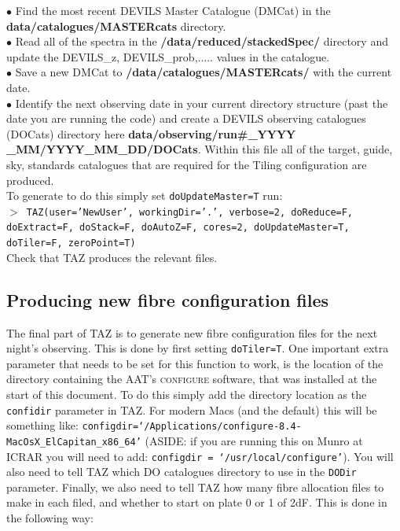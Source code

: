\documentclass[12pt]{article}
\begin{document}
$\bullet$ Find the most recent DEVILS Master Catalogue (DMCat) in the \textbf{data/catalogues/MASTERcats} directory.\\


$\bullet$ Read all of the spectra in the \textbf{/data/reduced/stackedSpec/} directory and update the DEVILS\_z,  DEVILS\_prob,..... values in the catalogue.\\

$\bullet$ Save a new DMCat to \textbf{/data/catalogues/MASTERcats/} with the current date. \\

$\bullet$ Identify the next observing date in your current directory structure (past the date you are running the code) and create a DEVILS observing catalogues (DOCats) directory here \textbf{data/observing/run\#\_YYYY \_MM/YYYY\_MM\_DD/DOCats}. Within this file all of the target, guide, sky, standards catalogues that are required for the Tiling configuration are produced.\\

To generate to do this simply set \texttt{doUpdateMaster=T} run:\\

  \hspace{10mm} \texttt{$>$ TAZ(user='NewUser', workingDir='.', verbose=2, doReduce=F, doExtract=F, doStack=F, doAutoZ=F,  cores=2, doUpdateMaster=T, doTiler=F, zeroPoint=T)}\\  
  
  Check that TAZ produces the relevant files. 


 \subsection{Producing new fibre configuration files}
 
 The final part of TAZ is to generate new fibre configuration files for the next night's observing. This is done by first setting \texttt{doTiler=T}. One important extra parameter that needs to be set for this function to work, is the location of the directory containing the AAT's \textsc{configure} software, that was installed at the start of this document. To do this simply add the directory location as the \texttt{confidir} parameter in TAZ. For modern Macs (and the default) this will be something like: \texttt{configdir=`/Applications/configure-8.4-MacOsX\_ElCapitan\_x86\_64'} (ASIDE: if you are running this on Munro at ICRAR you will need to add: \texttt{configdir = `/usr/local/configure'}). You will also need to tell TAZ which DO catalogues directory to use in the \texttt{DODir} parameter. Finally, we also need to tell TAZ how many fibre allocation files to make in each filed, and whether to start on plate 0 or 1 of 2dF. This is done in the following way: \\
 
\end{document}
